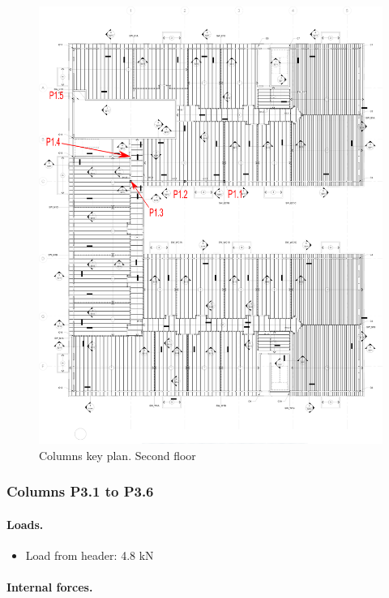 \begin{figure}
  \begin{center}
  \includegraphics[width=120mm]{figures/columns_key_plan_2nd_floor}
  \end{center}
  \caption{Columns key plan. Second floor}\label{fg_columns_key_plan_2nd_floor}
\end{figure}

\subsubsection{Columns P3.1 to P3.6}

\paragraph{Loads.}

\begin{itemize}
\item Load from header: 4.8 kN
\end{itemize}

\paragraph{Internal forces.}

